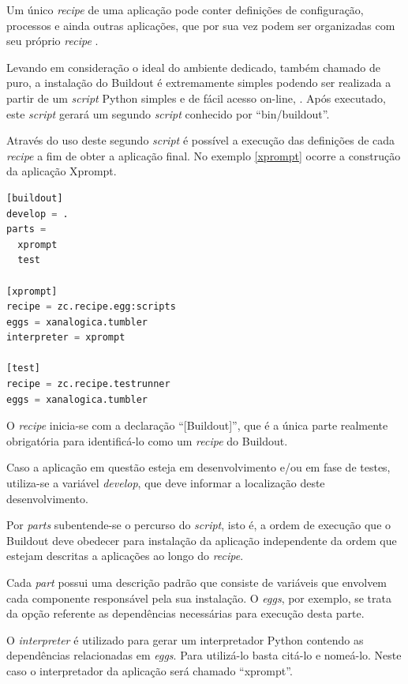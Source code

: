 Um único \textit{recipe} de uma aplicação pode conter definições de configuração, processos e ainda outras aplicações, que por sua vez podem ser organizadas com seu próprio \textit{recipe} \cite{BRANDOM}.

Levando em consideração o ideal do ambiente dedicado, também chamado de puro, a instalação do Buildout é extremamente simples podendo ser realizada a partir de um \textit{script} Python simples e de fácil acesso on-line, \cite{BOOTSTRAP}. Após executado, este \textit{script} gerará um segundo \textit{script} conhecido por ``bin/buildout''. 

Através do uso deste segundo \textit{script} é possível a execução das definições de cada \textit{recipe} a fim de obter a aplicação final. No exemplo \ref{xprompt} ocorre a construção da aplicação Xprompt.

{\singlespace
\begin{lstlisting}[caption=Exemplo de um \textit{script} Buildout,language=python,label={xprompt}]
[buildout]
develop = .
parts = 
  xprompt
  test

[xprompt]
recipe = zc.recipe.egg:scripts
eggs = xanalogica.tumbler
interpreter = xprompt

[test]
recipe = zc.recipe.testrunner
eggs = xanalogica.tumbler

\end{lstlisting}
}

O \textit{recipe} inicia-se com a declaração ``[Buildout]'', que é a única parte realmente obrigatória para identificá-lo como um \textit{recipe} do Buildout.

Caso a aplicação em questão esteja em desenvolvimento e/ou em fase de testes, utiliza-se a variável \textit{develop}, que deve informar a localização deste desenvolvimento.

Por \textit{parts} subentende-se o percurso do \textit{script}, isto é, a ordem de execução que o Buildout deve obedecer para instalação da aplicação independente da ordem que estejam descritas a aplicações ao longo do \textit{recipe}.

Cada \textit{part} possui uma descrição padrão que consiste de variáveis que envolvem cada componente responsável pela sua instalação. O \textit{eggs}, por exemplo, se trata da opção referente as dependências necessárias para execução desta parte.

O \textit{interpreter} é utilizado para gerar um interpretador Python contendo as dependências relacionadas em \textit{eggs}. Para utilizá-lo basta citá-lo e nomeá-lo. Neste caso o interpretador da aplicação será chamado ``xprompt''.

